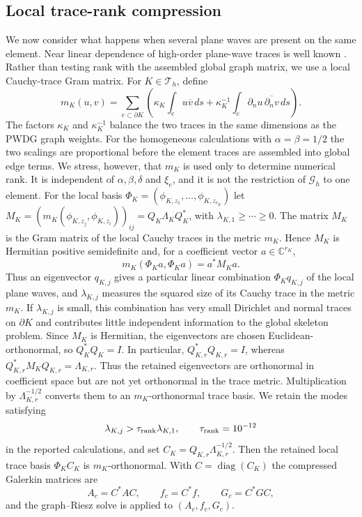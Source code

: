 \documentclass[pdflatex,sn-mathphys-num]{sn-jnl}
\theoremstyle{thmstyleone}
\theoremstyle{thmstyletwo}
\begin{document}
\subsection{Local trace-rank compression}\label{subsec:compression}
We now consider what happens when several plane waves are present on the same element.  Near linear dependence of high-order plane-wave traces is well known \cite{CongreveGedickePerugia2019,BarucqBendaliDiazTordeux2021,ParolinHuybrechsMoiola2023}.  Rather than testing rank with the assembled global graph matrix, we use a local Cauchy-trace Gram matrix.  For $K\in\mathcal T_h$, define
\begin{equation}\label{eq:localmetric}
 m_K(u,v)=\sum_{e\subset\partial K}\left(
 \kappa_K\int_eu\overline v\,ds
 +\kappa_K^{-1}\int_e\partial_nu\,\overline{\partial_nv}\,ds\right).
\end{equation}
The factors $\kappa_K$ and $\kappa_K^{-1}$ balance the two traces in the same dimensions as the PWDG graph weights.  For the homogeneous calculations with $\alpha=\beta=1/2$ the two scalings are proportional before the element traces are assembled into global edge terms.  We stress, however, that $m_K$ is used only to determine numerical rank.  It is independent of $\alpha,\beta,\delta$ and $\xi_e$, and it is not the restriction of $\mathcal G_h$ to one element.  For the local basis $\Phi_K=(\phi_{K,z_1},\ldots,\phi_{K,z_{r_K}})$ let
$M_K=(m_K(\phi_{K,z_j},\phi_{K,z_i}))_{ij}=Q_K\Lambda_KQ_K^*$, with
$\lambda_{K,1}\ge\cdots\ge0$.  The matrix $M_K$ is the Gram matrix of the local Cauchy traces in the metric $m_K$.  Hence $M_K$ is Hermitian positive semidefinite and, for a coefficient vector $a\in\mathbb C^{r_K}$,
\[
 m_K(\Phi_Ka,\Phi_Ka)=a^*M_Ka.
\]
Thus an eigenvector $q_{K,j}$ gives a particular linear combination $\Phi_Kq_{K,j}$ of the local plane waves, and $\lambda_{K,j}$ measures the squared size of its Cauchy trace in the metric $m_K$.  If $\lambda_{K,j}$ is small, this combination has very small Dirichlet and normal traces on $\partial K$ and contributes little independent information to the global skeleton problem.  Since $M_K$ is Hermitian, the eigenvectors are chosen Euclidean-orthonormal, so $Q_K^*Q_K=I$.  In particular, $Q_{K,r}^*Q_{K,r}=I$, whereas $Q_{K,r}^*M_KQ_{K,r}=\Lambda_{K,r}$.  Thus the retained eigenvectors are orthonormal in coefficient space but are not yet orthonormal in the trace metric.  Multiplication by $\Lambda_{K,r}^{-1/2}$ converts them to an $m_K$-orthonormal trace basis.  We retain the modes satisfying
\begin{equation}\label{eq:rankrule}
 \lambda_{K,j}>\tau_{\rm rank}\lambda_{K,1},
 \qquad \tau_{\rm rank}=10^{-12}
\end{equation}
in the reported calculations, and set $C_K=Q_{K,r}\Lambda_{K,r}^{-1/2}$.  Then the retained local trace basis $\Phi_KC_K$ is $m_K$-orthonormal.  With $C=\operatorname{diag}(C_K)$ the compressed Galerkin matrices are
\begin{equation}\label{eq:compressed-system}
 A_c=C^*AC,\qquad f_c=C^*f,\qquad G_c=C^*GC,
\end{equation}
and the graph--Riesz solve is applied to $(A_c,f_c,G_c)$.
\end{document}
